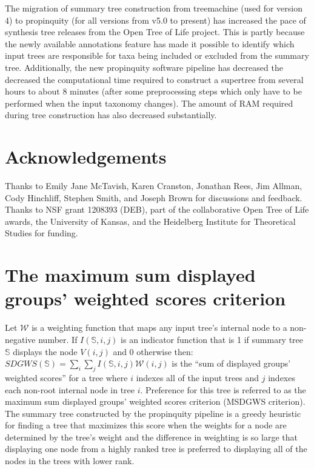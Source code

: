 \documentclass[fleqn,12pt,lineno,english]{wlpeerj}
\begin{document}
The migration of summary tree construction from treemachine (used for
version 4) to propinquity (for all versions from v5.0 to present) has
increased the pace of synthesis tree releases from the Open Tree of
Life project.  This is partly because the newly available annotations
feature has made it possible to identify which input trees are
responsible for taxa being included or excluded from the summary tree.
Additionally, the new propinquity software pipeline has decreased the decreased
the computational time required to construct a supertree from several
hours to about 8 minutes (after some preprocessing steps which only
have to be performed when the input taxonomy changes).  The amount of
RAM required during tree construction has also decreased substantially. 

\section{Acknowledgements}

Thanks to Emily Jane McTavish, Karen Cranston, Jonathan Rees, Jim Allman, Cody Hinchliff,
Stephen Smith, and Joseph Brown for discussions and feedback. Thanks
to NSF grant 1208393 (DEB), part of the collaborative Open Tree of
Life awards, the University of Kansas, and the Heidelberg Institute
for Theoretical Studies for funding.





\appendix

\section{The maximum sum displayed groups' weighted scores criterion}\label{sec:The-maximum-sum}

Let $\mathcal{W}$ is a weighting function that maps any input tree's
internal node to a non-negative number. If $I(\mathbb{S},i,j)$ is
an indicator function that is 1 if summary tree $\mathbb{S}$ displays
the node $V(i,j)$ and 0 otherwise then: $SDGWS(\mathbb{S})=\sum_{i}\sum_{j}I(\mathbb{S},i,j)\mathcal{W}(i,j)$
is the ``sum of displayed groups' weighted scores'' for a tree where
$i$ indexes all of the input trees and $j$ indexes each non-root
internal node in tree $i$. Preference for this tree is referred to
as the maximum sum displayed groups' weighted scores criterion (MSDGWS
criterion). The summary tree constructed by the propinquity pipeline
is a greedy heuristic for finding a tree that maximizes this score
when the weights for a node are determined by the tree's weight and
the difference in weighting is so large that displaying one node from
a highly ranked tree is preferred to displaying all of the nodes in
the trees with lower rank.
\end{document}

